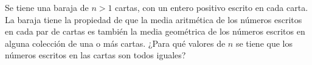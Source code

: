 Se tiene una baraja de $n \gt 1$ cartas, con un entero positivo escrito en cada carta. La baraja tiene la propiedad de que la media aritmética de los números escritos en cada par de cartas es también la media geométrica de los números escritos en alguna colección de una o más cartas.
¿Para qué valores de $n$ se tiene que los números escritos en las cartas son todos iguales?